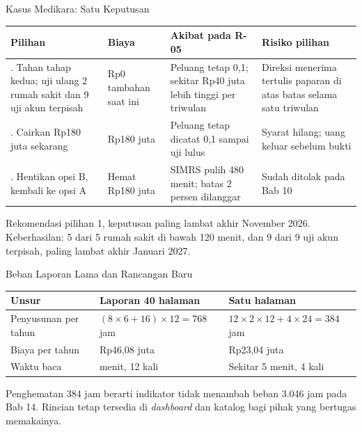 \documentclass[aspectratio=169, table, 12pt]{beamer}
\begin{document}
\begin{frame}{{\Large Kasus Medikara: Satu Keputusan}}
  \vspace{2pt}
  \scriptsize
  \begin{tabularx}{\textwidth}{|>{\raggedright\arraybackslash}p{}|>{\raggedright\arraybackslash}p{}|>{\raggedright\arraybackslash}X|>{\raggedright\arraybackslash}X|}
    \hline
    \textbf{Pilihan} & \textbf{Biaya} & \textbf{Akibat pada R-05} & \textbf{Risiko pilihan} \\
    \hline
    1. Tahan tahap kedua; uji ulang 2 rumah sakit dan 9 uji akun terpisah & Rp0 tambahan saat ini
    & Peluang tetap 0,1; sekitar Rp40 juta lebih tinggi per triwulan & Direksi menerima tertulis
    paparan di atas batas selama satu triwulan \\ \hline
    2. Cairkan Rp180 juta sekarang & Rp180 juta & Peluang tetap dicatat 0,1 sampai uji lulus &
    Syarat hilang; uang keluar sebelum bukti \\ \hline
    3. Hentikan opsi B, kembali ke opsi A & Hemat Rp180 juta & SIMRS pulih 480 menit; batas 2
    persen dilanggar & Sudah ditolak pada Bab 10 \\ \hline
  \end{tabularx}

  \vspace{6pt}
  \small Rekomendasi pilihan 1, keputusan paling lambat akhir November 2026. Keberhasilan: 5 dari
  5 rumah sakit di bawah 120 menit, dan 9 dari 9 uji akun terpisah, paling lambat akhir Januari
  2027.
\end{frame}

\begin{frame}{{\Large Beban Laporan Lama dan Rancangan Baru}}
  \vspace{4pt}
  \footnotesize
  \begin{tabularx}{\textwidth}{|>{\raggedright\arraybackslash}X|>{\raggedright\arraybackslash}p{}|>{\raggedright\arraybackslash}p{}|}
    \hline
    \textbf{Unsur} & \textbf{Laporan 40 halaman} & \textbf{Satu halaman} \\ \hline
    Penyusunan per tahun & $(8 \times 6 + 16) \times 12 = 768$ jam & $12 \times 2 \times 12 + 4
    \times 24 = 384$ jam \\ \hline
    Biaya per tahun & Rp46,08 juta & Rp23,04 juta \\ \hline
    Waktu baca & 80 menit, 12 kali & Sekitar 5 menit, 4 kali \\ \hline
  \end{tabularx}

  \vspace{8pt}
  \small Penghematan 384 jam berarti indikator tidak menambah beban 3.046 jam pada Bab 14. Rincian
  tetap tersedia di \textit{dashboard} dan katalog bagi pihak yang bertugas memakainya.
\end{frame}
\end{document}

